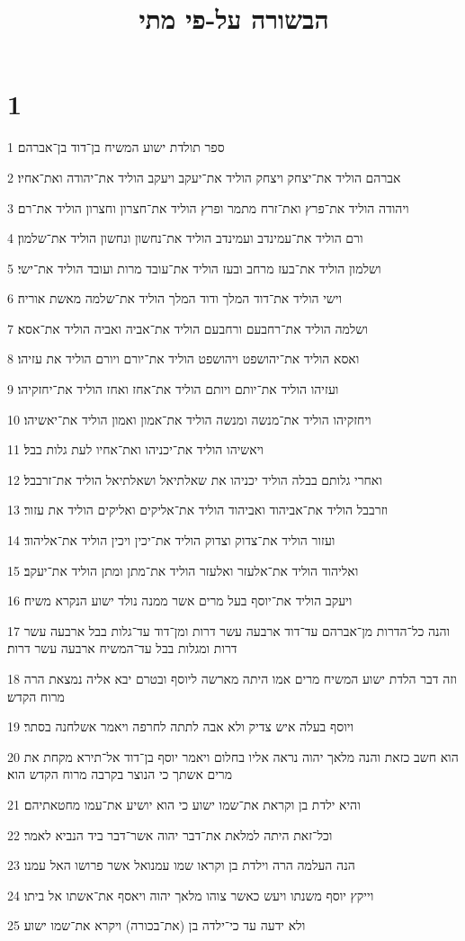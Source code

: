 

\title{הבשורה על-פי מתי}


\chapter{1}

\par 1 ספר תולדת ישוע המשיח בן־דוד בן־אברהם׃
\par 2 אברהם הוליד את־יצחק ויצחק הוליד את־יעקב ויעקב הוליד את־יהודה ואת־אחיו׃
\par 3 ויהודה הוליד את־פרץ ואת־זרח מתמר ופרץ הוליד את־חצרון וחצרון הוליד את־רם׃
\par 4 ורם הוליד את־עמינדב ועמינדב הוליד את־נחשון ונחשון הוליד את־שלמון׃
\par 5 ושלמון הוליד את־בעז מרחב ובעז הוליד את־עובד מרות ועובד הוליד את־ישי׃
\par 6 וישי הוליד את־דוד המלך ודוד המלך הוליד את־שלמה מאשת אוריה׃
\par 7 ושלמה הוליד את־רחבעם ורחבעם הוליד את־אביה ואביה הוליד את־אסא׃
\par 8 ואסא הוליד את־יהושפט ויהושפט הוליד את־יורם ויורם הוליד את עזיהו׃
\par 9 ועזיהו הוליד את־יותם ויותם הוליד את־אחז ואחז הוליד את־יחזקיהו׃
\par 10 ויחזקיהו הוליד את־מנשה ומנשה הוליד את־אמון ואמון הוליד את־יאשיהו׃
\par 11 ויאשיהו הוליד את־יכניהו ואת־אחיו לעת גלות בבל׃
\par 12 ואחרי גלותם בבלה הוליד יכניהו את שאלתיאל ושאלתיאל הוליד את־זרבבל׃
\par 13 וזרבבל הוליד את־אביהוד ואביהוד הוליד את־אליקים ואליקים הוליד את עזור׃
\par 14 ועזור הוליד את־צדוק וצדוק הוליד את־יכין ויכין הוליד את־אליהוד׃
\par 15 ואליהוד הוליד את־אלעזר ואלעזר הוליד את־מתן ומתן הוליד את־יעקב׃
\par 16 ויעקב הוליד את־יוסף בעל מרים אשר ממנה נולד ישוע הנקרא משיח׃
\par 17 והנה כל־הדרות מן־אברהם עד־דוד ארבעה עשר דרות ומן־דוד עד־גלות בבל ארבעה עשר דרות ומגלות בבל עד־המשיח ארבעה עשר דרות׃
\par 18 וזה דבר הלדת ישוע המשיח מרים אמו היתה מארשה ליוסף ובטרם יבא אליה נמצאת הרה מרוח הקדש׃
\par 19 ויוסף בעלה איש צדיק ולא אבה לתתה לחרפה ויאמר אשלחנה בסתר׃
\par 20 הוא חשב כזאת והנה מלאך יהוה נראה אליו בחלום ויאמר יוסף בן־דוד אל־תירא מקחת את מרים אשתך כי הנוצר בקרבה מרוח הקדש הוא׃
\par 21 והיא ילדת בן וקראת את־שמו ישוע כי הוא יושיע את־עמו מחטאתיהם׃
\par 22 וכל־זאת היתה למלאת את־דבר יהוה אשר־דבר ביד הנביא לאמר׃
\par 23 הנה העלמה הרה וילדת בן וקראו שמו עמנואל אשר פרושו האל עמנו׃
\par 24 וייקץ יוסף משנתו ויעש כאשר צוהו מלאך יהוה ויאסף את־אשתו אל ביתו׃
\par 25 ולא ידעה עד כי־ילדה בן (את־בכורה) ויקרא את־שמו ישוע׃

